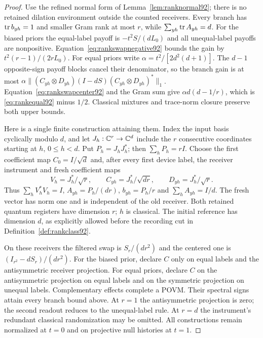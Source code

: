 \begin{proof}
Use the refined normal form of Lemma~\ref{lem:ranknormal92}; there is
no retained dilation environment outside the counted receivers.
Every branch has $\operatorname{tr} b_{yh}=1$ and smaller Gram rank at most $r$,
while $\sum_{yh}\operatorname{tr} A_{yh}=d$.
For the biased priors the equal-label payoff is
$-t^2 S/(dL_0)$ and all unequal-label payoffs are nonpositive.
Equation~\eqref{eq:rankswapnegative92} bounds the gain by
$t^2(r-1)/(2rL_0)$.
For equal priors write $\alpha=t^2/[2d^2(d+1)]$.
The $d-1$ opposite-sign payoff blocks cancel their denominator, so the
branch gain is at most
$\alpha\|(C_{yh}\otimes D_{yh})(I-dS)(C_{yh}\otimes D_{yh})^*\|_1$.
Equation~\eqref{eq:rankswapcenter92} and the Gram sum give
$\alpha d(d-1/r)$, which is \eqref{eq:rankequal92} minus $1/2$.
Classical mixtures and trace-norm closure preserve both upper bounds.

Here is a single finite construction attaining them.  Index the input
basis cyclically modulo $d$, and let $J_h:\mathbb C^r\to\mathbb C^d$ include the
$r$ consecutive coordinates starting at $h$, $0\le h<d$.
Put $P_h=J_hJ_h^*$; then $\sum_hP_h=rI$.
Choose the first coefficient map $C_0=I/\sqrt d$ and, after every
first device label, the receiver instrument and fresh coefficient maps
\begin{equation}\label{eq:cyclicrankprotocol92}
 V_h=J_h^*/\sqrt r,\qquad
 C_{yh}=J_h^*/\sqrt{dr},\qquad D_{yh}=J_h^*/\sqrt r.
\end{equation}
Thus $\sum_hV_h^*V_h=I$,
$A_{yh}=P_h/(dr)$, $b_{yh}=P_h/r$ and $\sum_hA_{yh}=I/d$.
The fresh vector has norm one and is independent of the old receiver.
Both retained quantum registers have dimension $r$; $h$ is classical.
The initial reference has dimension $d$, as explicitly allowed before
the recording cut in Definition~\ref{def:rankclass92}.

On these receivers the filtered swap is $S_r/(dr^2)$ and the centered
one is $(I_{r^2}-dS_r)/(dr^2)$.  For the biased prior, declare $C$
only on equal labels and the antisymmetric receiver projection.
For equal priors, declare $C$ on the antisymmetric projection on
equal labels and on the symmetric projection on unequal labels.
Complementary effects complete a POVM.  Their spectral signs attain
every branch bound above.  At $r=1$ the antisymmetric projection is
zero; the second readout reduces to the unequal-label rule.  At $r=d$
the instrument's redundant classical randomization may be omitted.
All constructions remain normalized at $t=0$ and on projective null
histories at $t=1$.
\end{proof}

